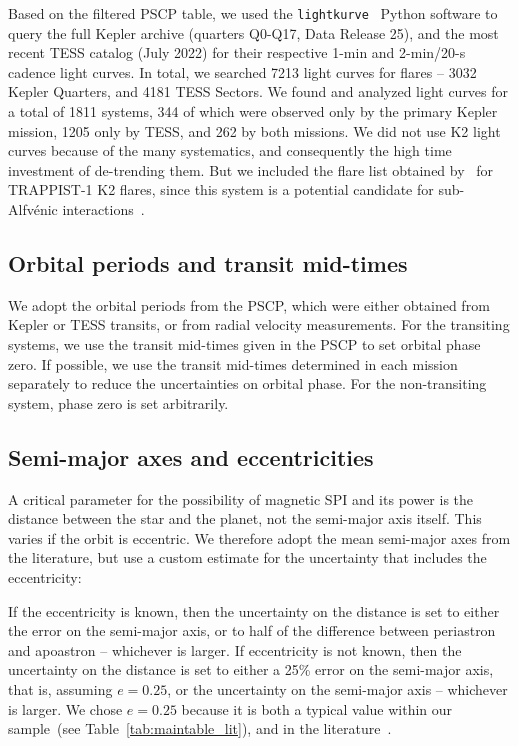 \documentclass[twocolumn]{aastex631}
\begin{document}
Based on the filtered PSCP table, we used the \texttt{lightkurve}~\citep{lightkurvecollaboration2018lightkurve} Python software to query the full Kepler archive (quarters Q0-Q17, Data Release 25), and the most recent TESS catalog (July 2022) for their respective 1-min and 2-min/20-s cadence light curves. In total, we searched 7213 light curves for flares -- 3032 Kepler Quarters, and 4181 TESS Sectors. We found and analyzed light curves for a total of 1811 systems, 344 of which were observed only by the primary Kepler mission, 1205 only by TESS, and 262 by both missions. We did not use K2 light curves because of the many systematics, and consequently the high time investment of de-trending them. But we included the flare list obtained by~\citet{paudel2018k2} for TRAPPIST-1 K2 flares, since this system is a potential candidate for sub-Alfv\'enic interactions~\citep{fischer2019timevariable}.

\subsection{Orbital periods and transit mid-times}
\label{sec:data:orbitalperiod}
We adopt the orbital periods from the PSCP, which were either obtained from Kepler or TESS transits, or from radial velocity measurements. For the transiting systems, we use the transit mid-times given in the PSCP to set orbital phase zero. If possible, we use the transit mid-times determined in each mission separately to reduce the uncertainties on orbital phase. For the non-transiting system, phase zero is set arbitrarily.

\subsection{Semi-major axes and eccentricities}
\label{sec:data:a}
A critical parameter for the possibility of magnetic SPI and its power is the distance between the star and the planet, not the semi-major axis itself. This varies if the orbit is eccentric. We therefore adopt the mean semi-major axes from the literature, but use a custom estimate for the uncertainty that includes the eccentricity:

If the eccentricity is known, then the uncertainty on the distance is set to either the error on the semi-major axis, or to half of the difference between periastron and apoastron -- whichever is larger. If eccentricity is not known, then the uncertainty on the distance is set to either a 25\% error on the semi-major axis, that is, assuming $e=0.25$, or the uncertainty on the semi-major axis -- whichever is larger. We chose $e=0.25$ because it is both a typical value within our sample~(see Table~\ref{tab:maintable_lit}), and in the literature~\citep{eylen2019orbital}.
\end{document}

